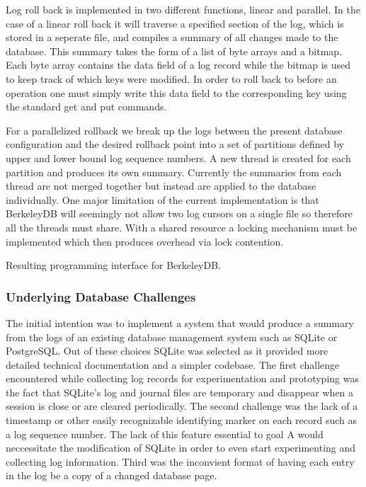 \documentclass{article}
\begin{document}
Log roll back is implemented in two different functions, linear and parallel. 
In the case of a linear roll back it will traverse a specified section of the log, which is stored in a seperate file, and compiles a summary of 
all changes made to the database. This summary takes the form of a list of byte arrays and a bitmap. 
Each byte array contains the data field of a log record while the bitmap is used to keep track of which keys were modified. In order to roll back to before an operation one must simply write this data field to the corresponding key using the standard get and put commands.

For a parallelized rollback we break up the logs between the present database configuration and the desired rollback point into a set of partitions defined by upper and lower bound log sequence numbers. 
A new thread is created for each partition and produces its own summary. Currently the summaries from each thread are not merged together but instead are applied to the database individually. One major limitation of the current implementation is that BerkeleyDB will seemingly not allow two log cursors on a single file so therefore all the threads must share. With a shared resource a locking mechanism must be implemented which then produces overhead via lock contention.


Resulting programming interface for BerkeleyDB.

\subsubsection{Underlying Database Challenges}
The initial intention was to implement a system that would produce a summary from the logs of an existing database management system such as SQLite or PostgreSQL. Out of these choices SQLite was selected as it provided more detailed technical documentation and a simpler codebase. The first challenge encountered while collecting log records for experimentation and prototyping was the fact that SQLite's log and journal files are temporary and disappear when a session is close or are cleared periodically. The second challenge was the lack of a timestamp or other easily recognizable identifying marker on each record such as a log sequence number. The lack of this feature essential to goal A would neccessitate the modification of SQLite in order to even start experimenting and collecting log information. Third was the inconvient format of having each entry in the log be a copy of a changed database page. 
\end{document}
